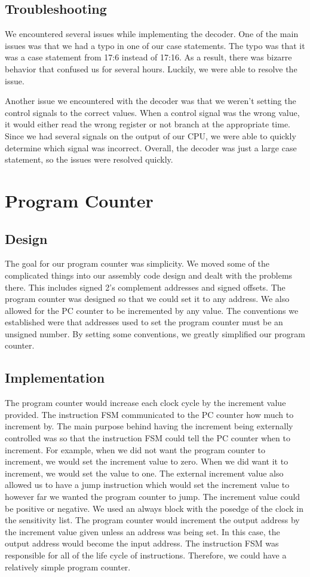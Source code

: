 \documentclass[11pt]{article}
\begin{document}
\subsection{Troubleshooting}
We encountered several issues while implementing the decoder. One of the main issues was that we had a typo in one of our case statements. The typo was that it was a case statement from 17:6 instead of 17:16. As a result, there was bizarre behavior that confused us for several hours. Luckily, we were able to resolve the issue. 

Another issue we encountered with the decoder was that we weren’t setting the control signals to the correct values. When a control signal was the wrong value, it would either read the wrong register or not branch at the appropriate time. Since we had several signals on the output of our CPU, we were able to quickly determine which signal was incorrect. Overall, the decoder was just a large case statement, so the issues were resolved quickly.

\section{Program Counter}
\subsection{Design}
The goal for our program counter was simplicity. We moved some of the complicated things into our assembly code design and dealt with the problems there. This includes signed 2’s complement addresses and signed offsets. The program counter was designed so that we could set it to any address. We also allowed for the PC counter to be incremented by any value. The conventions we established were that addresses used to set the program counter must be an unsigned number. By setting some conventions, we greatly simplified our program counter.

\subsection{Implementation}
The program counter would increase each clock cycle by the increment value provided. The instruction FSM communicated to the PC counter how much to increment by. The main purpose behind having the increment being externally controlled was so that the instruction FSM could tell the PC counter when to increment. For example, when we did not want the program counter to increment, we would set the increment value to zero. When we did want it to increment, we would set the value to one. The external increment value also allowed us to have a jump instruction which would set the increment value to however far we wanted the program counter to jump. The increment value could be positive or negative. We used an always block with the posedge of the clock in the sensitivity list. The program counter would increment the output address by the increment value given unless an address was being set. In this case, the output address would become the input address. The instruction FSM was responsible for all of the life cycle of instructions. Therefore, we could have a relatively simple program counter.
\end{document}
